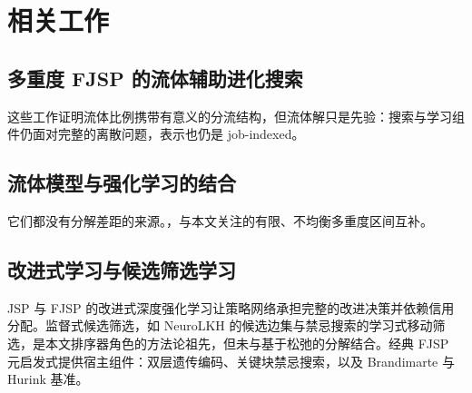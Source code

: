 \section{相关工作}\label{sec:related}

\subsection{多重度 FJSP 的流体辅助进化搜索}\label{sec:related-fluid}
这些工作证明流体比例携带有意义的分流结构，但流体解只是先验：搜索与学习组件仍面对完整的离散问题，表示也仍是 job-indexed。

\subsection{流体模型与强化学习的结合}\label{sec:related-rl}
它们都没有分解差距的来源。，与本文关注的有限、不均衡多重度区间互补。

\subsection{改进式学习与候选筛选学习}\label{sec:related-improve}
JSP 与 FJSP 的改进式深度强化学习让策略网络承担完整的改进决策并依赖信用分配。监督式候选筛选，如 NeuroLKH 的候选边集与禁忌搜索的学习式移动筛选，是本文排序器角色的方法论祖先，但未与基于松弛的分解结合。经典 FJSP 元启发式提供宿主组件：双层遗传编码\cite{pezzella2008genetic}、关键块禁忌搜索\cite{mastrolilli2000effective}，以及 Brandimarte\cite{brandimarte1993routing} 与 Hurink\cite{hurink1994tabu} 基准。

